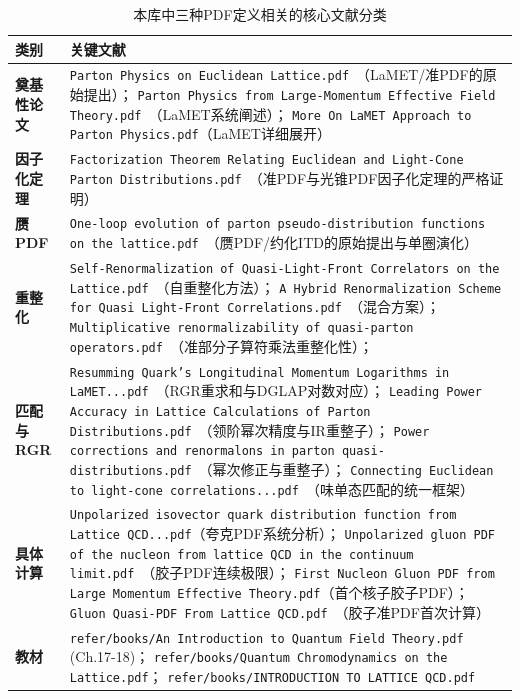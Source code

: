 \documentclass[12pt,a4paper]{ctexart}
\theoremstyle{definition}
\begin{document}
\begin{table}[H]
\centering
\caption{本库中三种PDF定义相关的核心文献分类}
\label{tab:three_pdfs_papers}
\small
\begin{tabular}{lp{8cm}}
\toprule
类别 & 关键文献 \\
\midrule
\textbf{奠基性论文} &
\texttt{Parton Physics on Euclidean Lattice.pdf}~\cite{Ji2013Euclidean}（LaMET/准PDF的原始提出）；
\texttt{Parton Physics from Large-Momentum Effective Field Theory.pdf}~\cite{Ji2014LaMET}（LaMET系统阐述）；
\texttt{More On LaMET Approach to Parton Physics.pdf}（LaMET详细展开） \\
\textbf{因子化定理} &
\texttt{Factorization Theorem Relating Euclidean and Light-Cone Parton Distributions.pdf}~\cite{Izubuchi2018}（准PDF与光锥PDF因子化定理的严格证明） \\
\textbf{赝PDF} &
\texttt{One-loop evolution of parton pseudo-distribution functions on the lattice.pdf}~\cite{Radyushkin2018oneLoop}（赝PDF/约化ITD的原始提出与单圈演化） \\
\textbf{重整化} &
\texttt{Self-Renormalization of Quasi-Light-Front Correlators on the Lattice.pdf}~\cite{Huo2021self}（自重整化方法）；
\texttt{A Hybrid Renormalization Scheme for Quasi Light-Front Correlations.pdf}~\cite{Ji2021hybrid}（混合方案）；
\texttt{Multiplicative renormalizability of quasi-parton operators.pdf}~\cite{Li2019multiplicative}（准部分子算符乘法重整化性）；\\
\textbf{匹配与RGR} &
\texttt{Resumming Quark's Longitudinal Momentum Logarithms in LaMET...pdf}~\cite{Su2023RGR}（RGR重求和与DGLAP对数对应）；
\texttt{Leading Power Accuracy in Lattice Calculations of Parton Distributions.pdf}~\cite{Zhang2023leadingPower}（领阶幂次精度与IR重整子）；
\texttt{Power corrections and renormalons in parton quasi-distributions.pdf}~\cite{Braun2019power}（幂次修正与重整子）；
\texttt{Connecting Euclidean to light-cone correlations...pdf}~\cite{Yao2023connecting}（味单态匹配的统一框架） \\
\textbf{具体计算} &
\texttt{Unpolarized isovector quark distribution function from Lattice QCD...pdf}（夸克PDF系统分析）；
\texttt{Unpolarized gluon PDF of the nucleon from lattice QCD in the continuum limit.pdf}~\cite{Chen2025gluon}（胶子PDF连续极限）；
\texttt{First Nucleon Gluon PDF from Large Momentum Effective Theory.pdf}（首个核子胶子PDF）；
\texttt{Gluon Quasi-PDF From Lattice QCD.pdf}~\cite{Fan2018gluonQuasi}（胶子准PDF首次计算） \\
\textbf{教材} &
\texttt{refer/books/An Introduction to Quantum Field Theory.pdf} (Ch.17-18)；
\texttt{refer/books/Quantum Chromodynamics on the Lattice.pdf}；
\texttt{refer/books/INTRODUCTION TO LATTICE QCD.pdf} \\
\bottomrule
\end{tabular}
\end{table}
\end{document}
